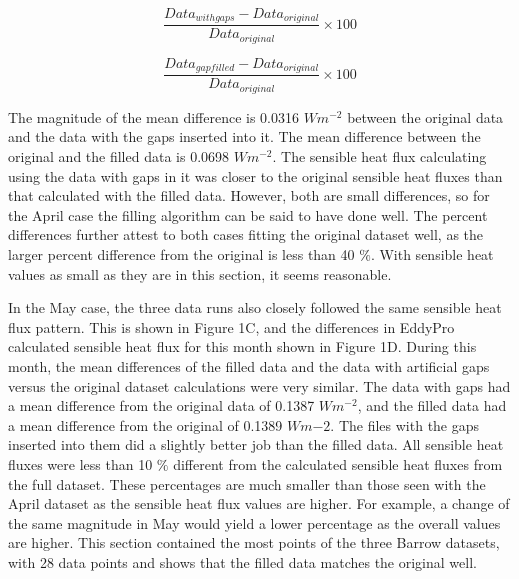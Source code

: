 \begin{equation}\label{eq:withgaps}
\frac{Data_{with gaps} - Data_{original}}{Data_{original}} \times 100
\end{equation}

\begin{equation}\label{eq:withoutgaps}
\frac{Data_{gap filled} - Data_{original}}{Data_{original}} \times 100
\end{equation}

The magnitude of the mean difference is 0.0316 $Wm^{-2}$ between the original data and the data with the gaps inserted into it. The mean difference between the original and the filled data is 0.0698 $Wm^{-2}$. The sensible heat flux calculating using the data with gaps in it was closer to the original sensible heat fluxes than that calculated with the filled data. However, both are small differences, so for the April case the filling algorithm can be said to have done well.  The percent differences further attest to both cases fitting the original dataset well, as the larger percent difference from the original is less than 40 $\%$. With sensible heat values as small as they are in this section, it seems reasonable.

In the May case, the three data runs also closely followed the same sensible heat flux pattern. This is shown in Figure 1C, and the differences in EddyPro calculated sensible heat flux for this month shown in Figure 1D. During this month, the mean differences of the filled data and the data with artificial gaps versus the original dataset calculations were very similar. The data with gaps had a mean difference from the original data of 0.1387 $Wm^{-2}$, and the filled data had a mean difference from the original of 0.1389 $Wm{-2}$. The files with the gaps inserted into them did a slightly better job than the filled data. All sensible heat fluxes were less than 10 $\%$ different from the calculated sensible heat fluxes from the full dataset. These percentages are much smaller than those seen with the April dataset as the sensible heat flux values are higher. For example, a change of the same magnitude in May would yield a lower percentage as the overall values are higher. This section contained the most points of the three Barrow datasets, with 28 data points and shows that the filled data matches the original well. 
 


